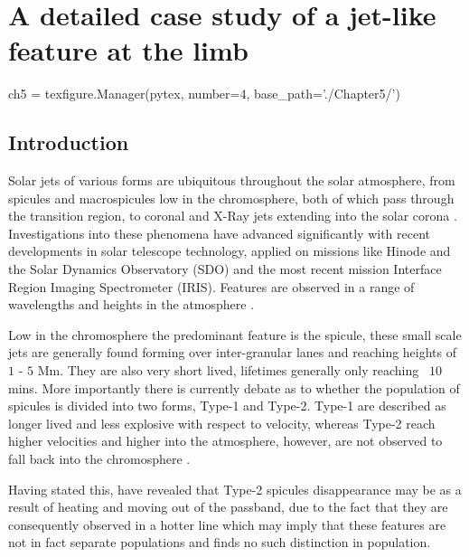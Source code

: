 

\label{ch:5}
\chapter{A detailed case study of a jet-like feature at the limb}
\begin{pycode}[chapter5]
ch5 = texfigure.Manager(pytex, number=4, base_path='./Chapter5/')
\end{pycode}

\section{Introduction}
Solar jets of various forms are ubiquitous throughout the solar atmosphere, from spicules and macrospicules low in the chromosphere, both of which pass through the transition region, to coronal and X-Ray jets extending into the solar corona \cite{Archonits2008,Majarska2011,Morton2012}. 
Investigations into these phenomena have advanced significantly with recent developments in solar telescope technology, applied on missions like Hinode and the Solar Dynamics Observatory (SDO) and the most recent mission Interface Region Imaging Spectrometer (IRIS).
Features are observed in a range of wavelengths and heights in the atmosphere \cite{Wang1998,Yamaucho2004}. 

Low in the chromosphere the predominant feature is the spicule, these small scale jets are generally found forming over inter-granular lanes and reaching heights of $1$ - $5$ Mm.
They are also very short lived, lifetimes generally only reaching ~$10$ mins.
More importantly there is currently debate as to whether the population of spicules is divided into two forms, Type-1 and Type-2. 
Type-1 are described as longer lived and less explosive with respect to velocity, whereas Type-2 reach higher velocities and higher into the atmosphere, however, are not observed to fall back into the chromosphere \cite{DePontieu2007,Beckers1968,Sterling2000}. 

Having stated this, \cite{Pereira2014} have revealed that Type-2 spicules disappearance may be as a result of heating and moving out of the passband, due to the fact that they are consequently observed in a hotter line which may imply that these features are not in fact separate populations and \cite{Zhang2012} finds no such distinction in population.

